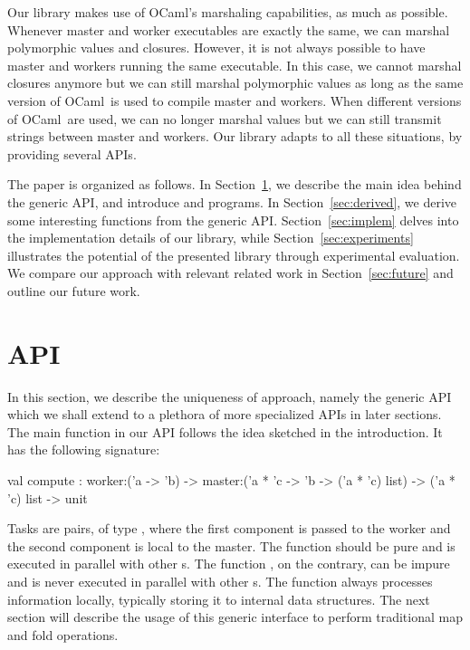 \documentclass[preprint]{sigplanconf}
\newcommand{\Ocaml}{OCaml}
\begin{document}
Our library makes use of \Ocaml's marshaling capabilities, as much as
possible. Whenever master and worker executables are exactly the same,
we can marshal polymorphic values and closures. However, it is not
always possible to have master and workers running the same
executable. In this case, we cannot marshal closures anymore but we
can still marshal polymorphic values as long as the same version of
\Ocaml\ is used to compile master and workers. When different versions
of \Ocaml\ are used, we can no longer marshal values but we can still
transmit strings between master and workers. Our library adapts to all
these situations, by providing several APIs.

\medskip
The paper is organized as follows. In Section~\ref{sec:API}, we
describe the main idea behind the generic API, and introduce
 and  programs. In Section~\ref{sec:derived}, we
derive some interesting functions from the generic
API. Section~\ref{sec:implem} delves into the implementation details
of our library, while Section~\ref{sec:experiments} illustrates the
potential of the presented library through experimental evaluation. We
compare our approach with relevant related work in
Section~\ref{sec:future} and outline our future work.

\section{API}\label{sec:API}
In this section, we describe the uniqueness of approach, namely the
generic API which we shall extend to a plethora of more specialized
APIs in later sections. The main function in our API follows the idea
sketched in the introduction. It has the following signature:
\begin{ocaml}
  val compute : 
    worker:('a -> 'b) -> 
    master:('a * 'c -> 'b -> ('a * 'c) list) -> 
    ('a * 'c) list -> unit
\end{ocaml}
Tasks are pairs, of type , where the first component is
passed to the worker and the second component is local to the master.
The function  should be pure and is executed in parallel
with other s. The function , on the
contrary, can be impure and is never executed in parallel with other
s. The function  always processes
information locally, typically storing it to internal data structures.
The next section will describe the usage of this generic interface to
perform traditional map and fold operations.
\end{document}
